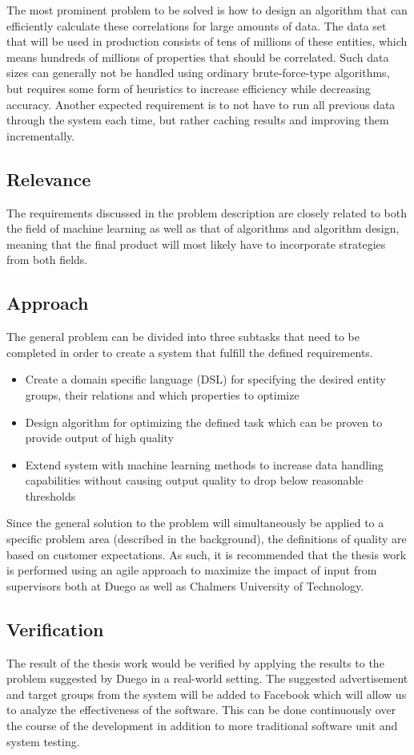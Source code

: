 \documentclass[a4paper]{article}
\begin{document}
The most prominent problem to be solved is how to design an algorithm that can efficiently calculate these correlations for
large amounts of data. The data set that will be used in production consists of tens of millions of these entities, which
means hundreds of millions of properties that should be correlated. Such data sizes can generally not be handled using
ordinary brute-force-type algorithms, but requires some form of heuristics to increase efficiency while decreasing accuracy.
Another expected requirement is to not have to run all previous data through the system each time, but rather caching results
and improving them incrementally.

\subsection{Relevance}
The requirements discussed in the problem description are closely related to both the field of machine learning as well as
that of algorithms and algorithm design, meaning that the final product will most likely have to incorporate strategies from
both fields.

\subsection{Approach}
\label{sec:approach}
The general problem can be divided into three subtasks that need to be completed in order to create a system that fulfill the
defined requirements.
\begin{itemize}
	\item Create a domain specific language (DSL) for specifying the desired entity groups, their relations and which
	properties to optimize
	\item Design algorithm for optimizing the defined task which can be proven to provide output of high quality
	\item Extend system with machine learning methods to increase data handling capabilities without causing output quality to
	 drop below reasonable thresholds
\end{itemize}
Since the general solution to the problem will simultaneously be applied to a specific problem area (described in the
background), the definitions of quality are based on customer expectations. As such, it is recommended that the thesis work is
performed using an agile approach to maximize the impact of input from supervisors both at Duego as well as Chalmers University
of Technology.

\subsection{Verification}
The result of the thesis work would be verified by applying the results to the problem suggested by Duego in a real-world setting.
 The suggested advertisement and target groups from the system will be added to Facebook which will allow us to analyze the
 effectiveness of the software. This can be done continuously over the course of the development in addition to more traditional
 software unit and system testing.


\end{document}

